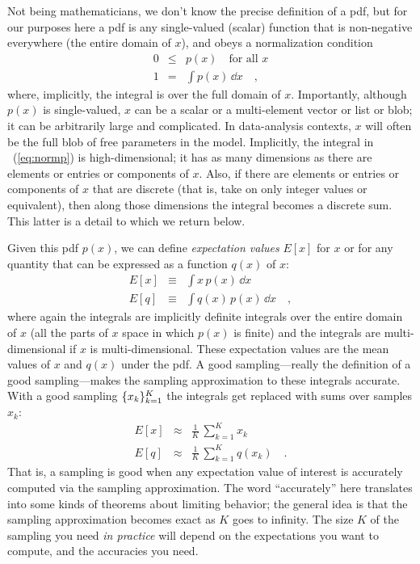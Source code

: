 \documentclass[12pt,twoside,pdftex]{article}
\begin{document}
Not being mathematicians, we don't know the precise definition of a
pdf, but for our purposes here a pdf is
any single-valued (scalar) function that is non-negative everywhere
(the entire domain of $x$), and obeys a normalization condition
\begin{eqnarray}
0 &\leq& p(x) \quad \mbox{for all $x$}
\\ \label{eq:normp}
1 &=& \int p(x)\,\dd x
\quad ,
\end{eqnarray}
where, implicitly, the integral is over the full domain of $x$.
Importantly, although $p(x)$ is single-valued, $x$ can be a scalar or
a multi-element vector or list or blob; it can be arbitrarily large
and complicated.
In data-analysis contexts, $x$ will often be the full blob of free
parameters in the model.
Implicitly, the integral in \equationname~(\ref{eq:normp}) is high-dimensional; it
has as many dimensions as there are elements or entries or components of $x$.
Also, if there are elements or entries or components of $x$ that are discrete
(that is, take on only integer values or equivalent),
then along those dimensions the integral becomes a discrete sum.
This latter is a detail to which we return below.

Given this pdf $p(x)$, we can define \emph{expectation values} $E[x]$
for $x$ or for any quantity that can be expressed as a function $q(x)$
of $x$:
\begin{eqnarray}
E[x] &\equiv& \int x\,p(x)\,\dd x
\\
E[q] &\equiv& \int q(x)\,p(x)\,\dd x
\quad ,
\end{eqnarray}
where again the integrals are implicitly definite integrals over the
entire domain
of $x$ (all the parts of $x$ space in which $p(x)$ is finite) and the
integrals are multi-dimensional if $x$ is multi-dimensional.
These expectation values are the mean values of $x$ and $q(x)$ under
the pdf.  A good sampling---really the definition of a good
sampling---makes the sampling approximation to these integrals
accurate.
With a good sampling $\{{x_k}\}_{k=1}^K$ the integrals get replaced
with sums over samples $x_k$:
\begin{eqnarray}
E[x] &\approx& \frac{1}{K}\,\sum_{k=1}^K x_k
\\
E[q] &\approx& \frac{1}{K}\,\sum_{k=1}^K q(x_k)
\quad .
\end{eqnarray}
That is, a sampling is good when any expectation value of interest is
accurately computed via the sampling approximation.
The word ``accurately'' here translates into some kinds of theorems
about limiting behavior; the general idea is that the sampling
approximation becomes exact as $K$ goes to infinity.
The size $K$ of the sampling you need \emph{in practice} will depend
on the expectations you want to compute, and the accuracies you need.
\end{document}
